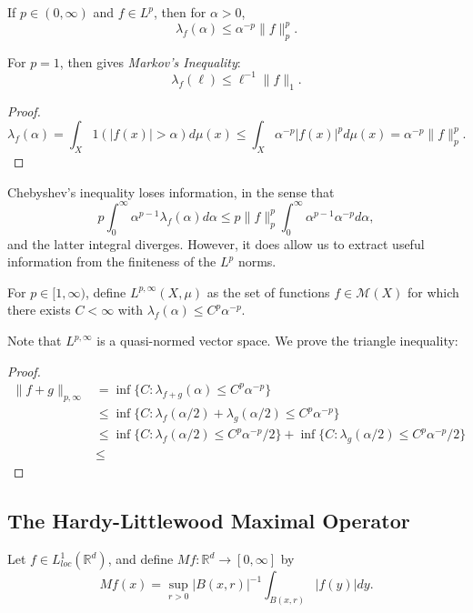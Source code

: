 \documentclass[11pt]{scrartcl}
\newcommand{\R}{\mathbb{R}}
\newcommand{\<}{\langle}
\renewcommand{\>}{\rangle}
\begin{document}
\begin{lemma} If $p \in (0, \infty)$ and $f \in L^p$, then for $\alpha > 0$,
$$\lambda_f(\alpha) \le \alpha^{-p} \|f\|_p^p.$$

For $p=1$, then gives \textit{Markov's Inequality}:
$$\lambda_f(\ell) \le \ell^{-1} \|f\|_1.$$
\end{lemma}
\begin{proof}
$$\lambda_f(\alpha) = \int_X 1(|f(x)| > \alpha) d\mu(x) \le \int_X \alpha^{-p}|f(x)|^p d\mu(x)= \alpha^{-p} \|f\|_p^p.$$
\end{proof}
Chebyshev's inequality loses information, in the sense that 
$$p\int_0^{\infty} \alpha^{p-1} \lambda_f(\alpha) d\alpha \le p\|f\|_p^p\int_0^\infty \alpha^{p-1} \alpha^{-p}d\alpha,$$
and the latter integral diverges.  However, it does allow us to extract useful information from the finiteness of the $L^p$ norms.

\begin{definition} For $p \in [1, \infty)$, define $L^{p, \infty}(X, \mu)$ as the set of functions $f \in \mathcal M(X)$ for which there exists $C < \infty$ with $\lambda_f(\alpha) \le C^p\alpha^{-p}$.
\end{definition}
Note that $L^{p, \infty}$ is a quasi-normed vector space.  We prove the triangle inequality:
\begin{proof}
\begin{align*}
\|f + g\|_{p, \infty} &= \inf \{C : \lambda_{f + g}(\alpha) \le C^p \alpha^{-p}\} \\
&\le \inf \{C : \lambda_{f }(\alpha/2) + \lambda_g(\alpha/2) \le C^p \alpha^{-p}\} \\
&\le \inf \{C: \lambda_f(\alpha/2) \le C^p \alpha^{-p}/2\} + \inf \{C: \lambda_g(\alpha/2) \le C^p \alpha^{-p}/2\} \\
&\le 
\end{align*}
\end{proof}

\subsection{The Hardy-Littlewood Maximal Operator}
\begin{definition}
Let $f \in L_{loc}^1(\R^d)$, and define $Mf : \R^d \to [0, \infty]$ by 
$$Mf(x) = \sup_{r > 0} |B(x, r)|^{-1} \int_{B(x, r)} |f(y)|dy.$$
\end{definition}
\end{document}
